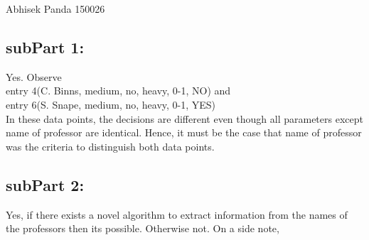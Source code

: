 \documentclass[a4paper,11pt]{article}
\begin{document}
								{Abhisek Panda}  		%
								{150026}					%




\begin{mlsolution}

\subsection{subPart 1:}
Yes. Observe \\
entry 4(C. Binns, medium, no, heavy, 0-1, NO) and\\
entry 6(S. Snape, medium, no, heavy, 0-1, YES)\\
In these data points, the decisions are different even though all parameters except name of professor are identical. Hence, it must be the case that name of professor was the criteria to distinguish both data points.

\subsection{subPart 2:}
Yes, if there exists a novel algorithm to extract information from the names of the professors then its possible. Otherwise not. On a side note,


\end{mlsolution}
\end{document}
